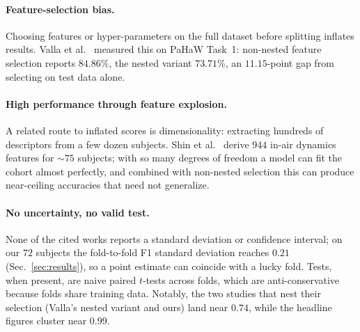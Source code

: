 \documentclass{article}
\begin{document}
\paragraph{Feature-selection bias.}
Choosing features or hyper-parameters on the full dataset before splitting inflates
results. Valla et al.\ \citep{valla2022} measured this on PaHaW Task~1: non-nested
feature selection reports $84.86\%$, the nested variant $73.71\%$, an $11.15$-point
gap from selecting on test data alone.

\paragraph{High performance through feature explosion.}
A related route to inflated scores is dimensionality: extracting hundreds of
descriptors from a few dozen subjects. Shin et al.\ \citep{shin2025} derive $944$
in-air dynamics features for $\sim\!75$ subjects; with so many degrees of freedom a
model can fit the cohort almost perfectly, and combined with non-nested selection
this can produce near-ceiling accuracies that need not generalize.

\paragraph{No uncertainty, no valid test.}
None of the cited works reports a standard deviation or confidence interval; on our
$72$ subjects the fold-to-fold F1 standard deviation reaches $0.21$
(Sec.~\ref{sec:results}), so a point estimate can coincide with a lucky fold. Tests,
when present, are naive paired $t$-tests across folds, which are anti-conservative
because folds share training data. Notably, the two studies that nest their selection
(Valla's nested variant and ours) land near $0.74$, while the headline figures
cluster near $0.99$.
\end{document}
